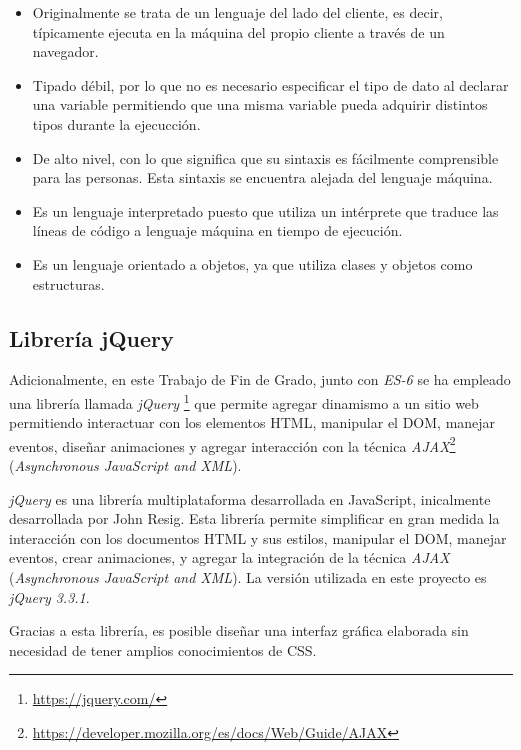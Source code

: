\documentclass[a4paper, 12pt]{book}
\begin{document}
\begin{itemize}
	\item Originalmente se trata de un lenguaje del lado del cliente, es decir, típicamente ejecuta en la máquina del propio cliente a través de un navegador.
	
	\item Tipado débil, por lo que no es necesario especificar el tipo de dato al declarar una variable permitiendo que una misma variable pueda adquirir distintos tipos durante la ejecucción.
	
	\item De alto nivel, con lo que significa que su sintaxis es fácilmente comprensible para las personas. Esta sintaxis se encuentra alejada del lenguaje máquina.
	
	\item Es un lenguaje interpretado puesto que utiliza un intérprete que traduce las líneas de código a lenguaje máquina en tiempo de ejecución.

	\item Es un lenguaje orientado a objetos, ya que utiliza clases y objetos como estructuras.
\end{itemize}

\subsection{Librería jQuery}
\label{subsec:javascript}

Adicionalmente, en este Trabajo de Fin de Grado, junto con \textit{ES-6} se ha empleado una librería llamada \textit{jQuery} \footnote{\url{https://jquery.com/}} que permite agregar dinamismo a un sitio web permitiendo interactuar con los elementos HTML, manipular el DOM, manejar eventos, diseñar animaciones y agregar interacción con la técnica \textit{AJAX}\footnote{\url{https://developer.mozilla.org/es/docs/Web/Guide/AJAX}} (\textit{Asynchronous JavaScript and XML}).

\textit{jQuery} es una librería multiplataforma desarrollada en JavaScript, inicalmente desarrollada por John Resig. Esta librería permite simplificar en gran medida la interacción con los documentos HTML y sus estilos, manipular el DOM, manejar eventos, crear animaciones, y agregar la integración de la técnica \textit{AJAX} (\textit{Asynchronous JavaScript and XML}). La versión utilizada en este proyecto es \emph{jQuery 3.3.1}.

Gracias a esta librería, es posible diseñar una interfaz gráfica elaborada sin necesidad de tener amplios conocimientos de CSS.
\end{document}
